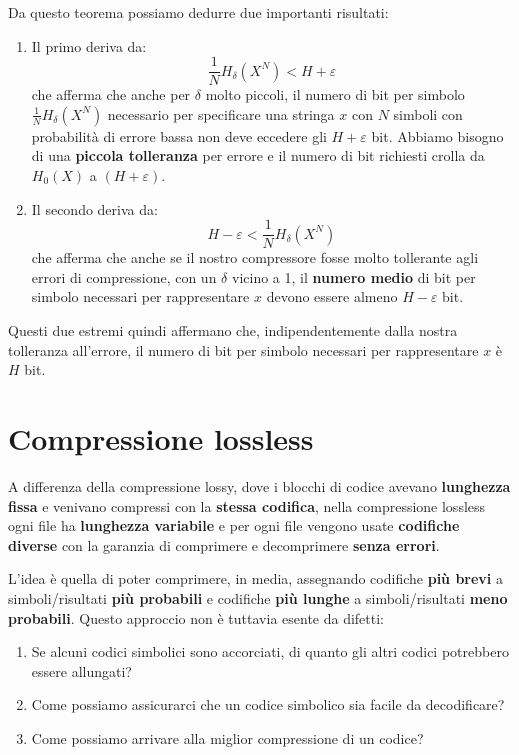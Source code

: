 Da questo teorema possiamo dedurre due importanti risultati:
\begin{enumerate}
	\item Il primo deriva da: $$\frac{1}{N} H_\delta(X^N) < H + \varepsilon$$
	che afferma che anche per $\delta$ molto piccoli, il numero di bit per simbolo $\frac{1}{N} H_\delta(X^N)$ necessario per specificare una stringa $x$ con $N$ simboli con probabilità di errore bassa non deve eccedere gli $H + \varepsilon$ bit. Abbiamo bisogno di una \textbf{piccola tolleranza} per errore e il numero di bit richiesti crolla da $H_0(X)$ a $(H+\varepsilon)$. 
	
	\item Il secondo deriva da: $$H - \varepsilon < \frac{1}{N} H_\delta(X^N)$$
	che afferma che anche se il nostro compressore fosse molto tollerante agli errori di compressione, con un $\delta$ vicino a 1, il \textbf{numero medio} di bit per simbolo necessari per rappresentare $x$ devono essere almeno $H - \varepsilon$ bit.
\end{enumerate}

Questi due estremi quindi affermano che, indipendentemente dalla nostra tolleranza all'errore, il numero di bit per simbolo necessari per rappresentare $x$ è $H$ bit.

\newpage
\section{Compressione lossless}

A differenza della compressione lossy, dove i blocchi di codice avevano \textbf{lunghezza fissa} e venivano compressi con la \textbf{stessa codifica}, nella compressione lossless ogni file ha \textbf{lunghezza variabile} e per ogni file vengono usate \textbf{codifiche diverse} con la garanzia di comprimere e decomprimere \textbf{senza errori}.

L'idea è quella di poter comprimere, in media, assegnando codifiche \textbf{più brevi} a simboli/risultati \textbf{più probabili} e codifiche \textbf{più lunghe} a simboli/risultati \textbf{meno probabili}. Questo approccio non è tuttavia esente da difetti:
\begin{enumerate}
	\item Se alcuni codici simbolici sono accorciati, di quanto gli altri codici potrebbero essere allungati?
	\item Come possiamo assicurarci che un codice simbolico sia facile da decodificare?
	\item Come possiamo arrivare alla miglior compressione di un codice?
\end{enumerate}

